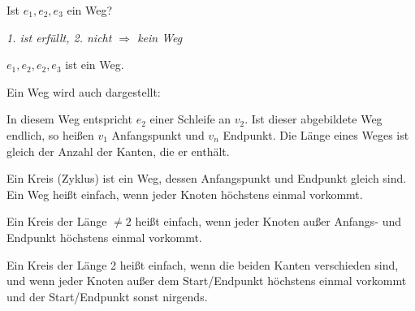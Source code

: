 \begin{beispiel}
	\qquad
	\vspace{2mm}
	
	\begin{minipage}{4cm}
	\end{minipage}
	\begin{minipage}{10cm}
		Ist $e_1, e_2, e_3$ ein Weg?
		
		\emph{1. ist erfüllt, 2. nicht $\Rightarrow$ kein Weg}
		 
		 $e_1, e_2, e_2, e_3$ ist ein Weg.
	\end{minipage}
\end{beispiel}


\begin{definition}
	Ein Weg wird auch dargestellt:
	\vspace{2mm}
	
	\begin{center}
	\end{center}
	
	In diesem Weg entspricht $e_2$ einer Schleife an $v_2$. Ist dieser abgebildete Weg endlich, so heißen $v_1$ Anfangspunkt und $v_n$ Endpunkt. Die Länge eines Weges ist gleich der Anzahl der Kanten, die er enthält.
	
	Ein Kreis (Zyklus) ist ein Weg, dessen Anfangspunkt und Endpunkt gleich sind. Ein Weg heißt einfach, wenn jeder Knoten höchstens einmal vorkommt. 
	
	Ein Kreis der Länge $\ne 2$ heißt einfach, wenn jeder Knoten außer Anfangs- und Endpunkt höchstens einmal vorkommt. 
	
	Ein Kreis der Länge 2 heißt einfach, wenn die beiden Kanten verschieden sind, und wenn jeder Knoten außer dem Start/Endpunkt höchstens einmal vorkommt und der Start/Endpunkt sonst nirgends.
\end{definition}

